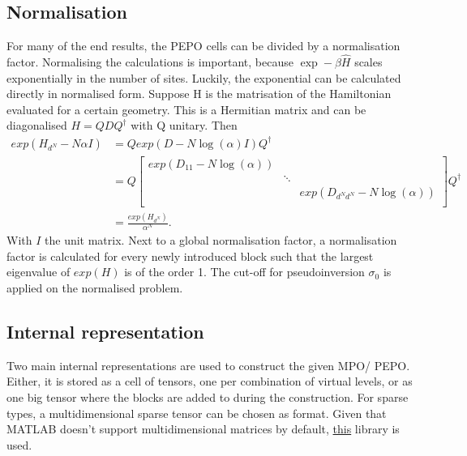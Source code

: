 \subsection{Normalisation}\label{subsec:nf}

For many of the end results, the PEPO cells can be divided by a normalisation factor. Normalising the calculations is important, because $\exp - \beta \hat{H}$ scales exponentially in the number of sites. Luckily, the exponential can be calculated directly in normalised form. Suppose H is the matrisation of the Hamiltonian evaluated for a certain geometry. This is a Hermitian matrix and can be diagonalised $H= Q D Q^{\dagger}$ with Q unitary. Then
\begin{align}
  exp(  H_{d^N} - N \alpha I  ) & =  Q exp(  D- N \log(\alpha ) I    ) Q^{\dagger} \\
                                & =  Q \begin{bmatrix} exp(D_{1 1} - N \log(\alpha )) &        &                                     \\
                                               & \ddots &                                     \\
                                               &        & exp(D_{ d^N d^N} - N \log(\alpha )) \\
  \end{bmatrix}  Q^{\dagger}     \\
                                & = \frac{  exp(  H_{d^N} ) }{ \alpha^N }.
\end{align}
With $I$ the unit matrix. Next to a global normalisation factor, a normalisation factor is calculated for every newly introduced block such that the largest eigenvalue of $exp(H)$ is of the order 1. The cut-off for pseudoinversion $\sigma_0$ is applied on the normalised problem.

\subsection{Internal representation}

Two main internal representations are used to construct the given \Gls{MPO}/ \Gls{PEPO}. Either, it is stored as a cell of tensors, one per combination of virtual levels, or as one big tensor where the blocks are added to during the construction. For sparse types, a multidimensional sparse tensor can be chosen as format. Given that MATLAB doesn't support multidimensional matrices by default, \href{https://nl.mathworks.com/matlabcentral/fileexchange/29832-n-dimensional-sparse-arrays}{this} \cite{Matt} library is used.

